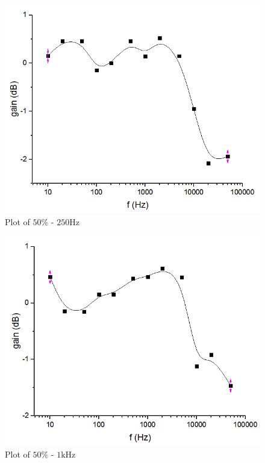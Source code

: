\begin{figure}
	\centering
	\begin{framed}
		\includegraphics[width=\linewidth]{images/10.PNG}
		\caption{Plot of $50\%$ - $250\si{\hertz}$}
		\label{fig:plot10}
	\end{framed}
\end{figure}

\begin{figure}
	\centering
	\begin{framed}
		\includegraphics[width=\linewidth]{images/11.PNG}
		\caption{Plot of $50\%$ - $1\si{\kilo\hertz}$}
		\label{fig:plot11}
	\end{framed}
\end{figure}

